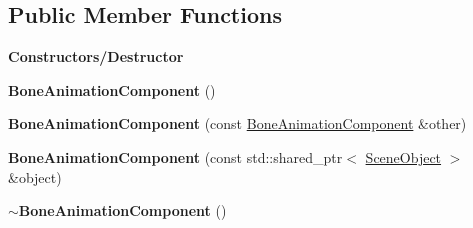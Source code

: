 \subsection*{Public Member Functions}
\begin{Indent}\textbf{ Constructors/\+Destructor}\par
\begin{DoxyCompactItemize}
\item 
\mbox{\label{classrev_1_1_bone_animation_component_a0779d0166ed7b6d44f66403fb2867b7d}} 
{\bfseries Bone\+Animation\+Component} ()
\item 
\mbox{\label{classrev_1_1_bone_animation_component_aaaddc97659eb980faea66e3d0f56ed16}} 
{\bfseries Bone\+Animation\+Component} (const \mbox{\hyperlink{classrev_1_1_bone_animation_component}{Bone\+Animation\+Component}} \&other)
\item 
\mbox{\label{classrev_1_1_bone_animation_component_ad1859609001ae1513de5aa624f2a77ff}} 
{\bfseries Bone\+Animation\+Component} (const std\+::shared\+\_\+ptr$<$ \mbox{\hyperlink{classrev_1_1_scene_object}{Scene\+Object}} $>$ \&object)
\item 
\mbox{\label{classrev_1_1_bone_animation_component_aab707141ed109c281b5bc402d59bcd06}} 
{\bfseries $\sim$\+Bone\+Animation\+Component} ()
\end{DoxyCompactItemize}
\end{Indent}
